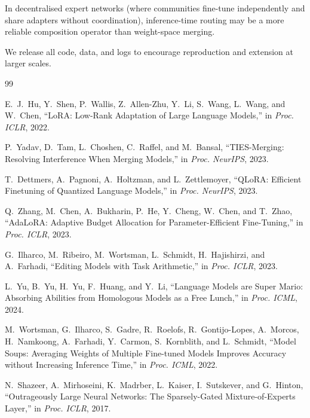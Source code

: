 \documentclass[conference, 10pt]{IEEEtran}
\begin{document}
In decentralised expert networks (where communities
fine-tune independently and share adapters without
coordination), inference-time routing may be a more
reliable composition operator than weight-space merging.

We release all code, data, and logs to encourage
reproduction and extension at larger scales.


\begin{thebibliography}{99}

E.~J.~Hu, Y.~Shen, P.~Wallis, Z.~Allen-Zhu, Y.~Li, S.~Wang, L.~Wang,
and W.~Chen,
``LoRA: Low-Rank Adaptation of Large Language Models,''
in \emph{Proc. ICLR}, 2022.

P.~Yadav, D.~Tam, L.~Choshen, C.~Raffel, and M.~Bansal,
``TIES-Merging: Resolving Interference When Merging Models,''
in \emph{Proc. NeurIPS}, 2023.

T.~Dettmers, A.~Pagnoni, A.~Holtzman, and L.~Zettlemoyer,
``QLoRA: Efficient Finetuning of Quantized Language Models,''
in \emph{Proc. NeurIPS}, 2023.

Q.~Zhang, M.~Chen, A.~Bukharin, P.~He, Y.~Cheng, W.~Chen, and T.~Zhao,
``AdaLoRA: Adaptive Budget Allocation for Parameter-Efficient Fine-Tuning,''
in \emph{Proc. ICLR}, 2023.

G.~Ilharco, M.~Ribeiro, M.~Wortsman, L.~Schmidt, H.~Hajishirzi, and A.~Farhadi,
``Editing Models with Task Arithmetic,''
in \emph{Proc. ICLR}, 2023.

L.~Yu, B.~Yu, H.~Yu, F.~Huang, and Y.~Li,
``Language Models are Super Mario: Absorbing Abilities from Homologous
Models as a Free Lunch,''
in \emph{Proc. ICML}, 2024.

M.~Wortsman, G.~Ilharco, S.~Gadre, R.~Roelofs, R.~Gontijo-Lopes,
A.~Morcos, H.~Namkoong, A.~Farhadi, Y.~Carmon, S.~Kornblith, and
L.~Schmidt,
``Model Soups: Averaging Weights of Multiple Fine-tuned Models Improves
Accuracy without Increasing Inference Time,''
in \emph{Proc. ICML}, 2022.

N.~Shazeer, A.~Mirhoseini, K.~Madrber, L.~Kaiser, I.~Sutskever, and
G.~Hinton,
``Outrageously Large Neural Networks: The Sparsely-Gated Mixture-of-Experts
Layer,''
in \emph{Proc. ICLR}, 2017.


\end{thebibliography}
\end{document}
